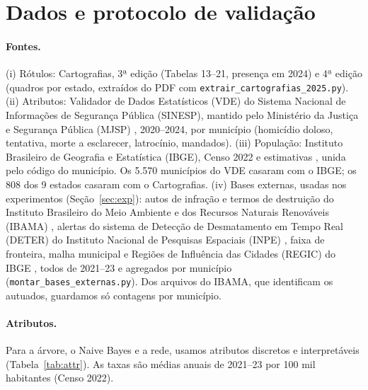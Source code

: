 \documentclass[article,12pt,oneside,a4paper,brazil,sumario=tradicional]{abntex2}
\begin{document}
\section{Dados e protocolo de validação}

\paragraph{Fontes.} (i) Rótulos: Cartografias, 3ª edição \cite{r4} (Tabelas 13--21,
presença em 2024) e 4ª edição \cite{r5} (quadros por estado, extraídos do PDF com
\texttt{extrair\_cartografias\_2025.py}). (ii) Atributos: Validador de Dados Estatísticos
(VDE) do Sistema Nacional de Informações de Segurança Pública (SINESP), mantido pelo
Ministério da Justiça e Segurança Pública (MJSP) \cite{r6}, 2020--2024, por município
(homicídio doloso, tentativa, morte a esclarecer, latrocínio, mandados). (iii) População:
Instituto Brasileiro de Geografia e Estatística (IBGE), Censo 2022 e estimativas \cite{r7},
unida pelo código do município. Os 5.570 municípios do VDE casaram com o IBGE; os 808 dos 9
estados casaram com o Cartografias. (iv) Bases externas, usadas nos experimentos
(Seção~\ref{sec:exp}): autos de infração e termos de destruição do Instituto
Brasileiro do Meio Ambiente e dos Recursos Naturais Renováveis (IBAMA) \cite{r8}, alertas do
sistema de Detecção de Desmatamento em Tempo Real (DETER) do Instituto Nacional de Pesquisas
Espaciais (INPE) \cite{r9}, faixa de fronteira, malha municipal e Regiões de Influência das
Cidades (REGIC) do IBGE \cite{r7}, todos de 2021--23 e agregados por município
(\texttt{montar\_bases\_externas.py}). Dos arquivos do IBAMA, que identificam os autuados,
guardamos só contagens por município.

\paragraph{Atributos.} Para a árvore, o Naive Bayes e a rede, usamos atributos discretos e
interpretáveis (Tabela~\ref{tab:attr}). As taxas são médias anuais de 2021--23 por 100 mil
habitantes (Censo 2022).
\end{document}
